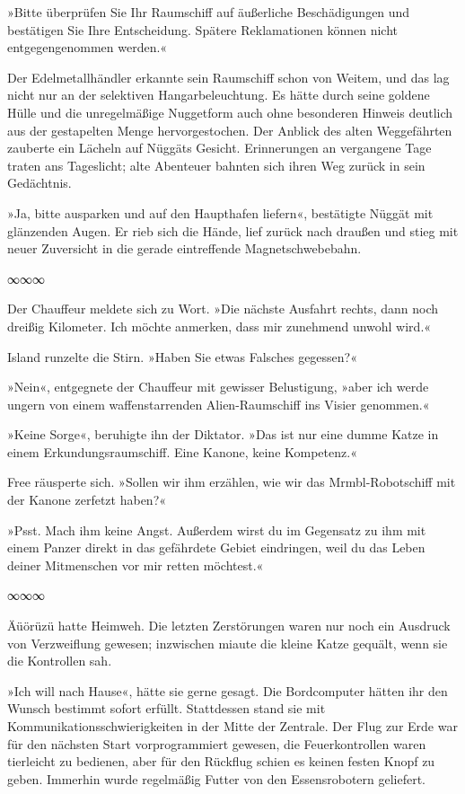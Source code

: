 »Bitte überprüfen Sie Ihr Raumschiff auf äußerliche Beschädigungen und bestätigen Sie Ihre Entscheidung. Spätere Reklamationen können nicht entgegengenommen werden.«

Der Edelmetallhändler erkannte sein Raumschiff schon von Weitem, und das lag nicht nur an der selektiven Hangarbeleuchtung. Es hätte durch seine goldene Hülle und die unregelmäßige Nuggetform auch ohne besonderen Hinweis deutlich aus der gestapelten Menge hervorgestochen. Der Anblick des alten Weggefährten zauberte ein Lächeln auf Nüggäts Gesicht. Erinnerungen an vergangene Tage traten ans Tageslicht; alte Abenteuer bahnten sich ihren Weg zurück in sein Gedächtnis.

»Ja, bitte ausparken und auf den Haupthafen liefern«, bestätigte Nüggät mit glänzenden Augen. Er rieb sich die Hände, lief zurück nach draußen und stieg mit neuer Zuversicht in die gerade eintreffende Magnetschwebebahn.

\begin{center}
∞∞∞
\end{center}

Der Chauffeur meldete sich zu Wort. »Die nächste Ausfahrt rechts, dann noch dreißig Kilometer. Ich möchte anmerken, dass mir zunehmend unwohl wird.«

Island runzelte die Stirn. »Haben Sie etwas Falsches gegessen?«

»Nein«, entgegnete der Chauffeur mit gewisser Belustigung, »aber ich werde ungern von einem waffenstarrenden Alien-Raumschiff ins Visier genommen.«

»Keine Sorge«, beruhigte ihn der Diktator. »Das ist nur eine dumme Katze in einem Erkundungsraumschiff. Eine Kanone, keine Kompetenz.«

Free räusperte sich. »Sollen wir ihm erzählen, wie wir das Mrmbl-Robotschiff mit der Kanone zerfetzt haben?«

»Psst. Mach ihm keine Angst. Außerdem wirst du im Gegensatz zu ihm mit einem Panzer direkt in das gefährdete Gebiet eindringen, weil du das Leben deiner Mitmenschen vor mir retten möchtest.«

\begin{center}
∞∞∞
\end{center}

Äüörüzü hatte Heimweh. Die letzten Zerstörungen waren nur noch ein Ausdruck von Verzweiflung gewesen; inzwischen miaute die kleine Katze gequält, wenn sie die Kontrollen sah.

»Ich will nach Hause«, hätte sie gerne gesagt. Die Bordcomputer hätten ihr den Wunsch bestimmt sofort erfüllt. Stattdessen stand sie mit Kommunikationsschwierigkeiten in der Mitte der Zentrale. Der Flug zur Erde war für den nächsten Start vorprogrammiert gewesen, die Feuerkontrollen waren tierleicht zu bedienen, aber für den Rückflug schien es keinen festen Knopf zu geben. Immerhin wurde regelmäßig Futter von den Essensrobotern geliefert.

